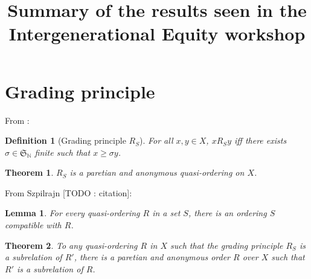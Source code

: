 \documentclass{article}
\title{Summary of the results seen in the Intergenerational Equity workshop}
\author{}
\newtheorem{definition}{Definition}
\newtheorem{theorem}{Theorem}
\newtheorem{lemma}{Lemma}
\begin{document}
\maketitle

\section{Grading principle}

From \cite{svensson80}:

\begin{definition}[Grading principle $R_S$]
    For all $x,y\in X$, $x R_S y$ iff there exists $\sigma\in\mathfrak{S}_{\mathbb{N}}$ finite
    such that $x\geq\sigma y$.
\end{definition}

\begin{theorem}
    $R_S$ is a paretian and anonymous quasi-ordering on $X$.
\end{theorem}

From Szpilrajn [TODO : citation]:
\begin{lemma}
    For every quasi-ordering $R$ in a set $S$, there is an ordering $S$ compatible with $R$.
\end{lemma}

\begin{theorem}
    To any quasi-ordering $R$ in $X$ such that the grading principle $R_S$ is a subrelation of
    $R'$, there is a paretian and anonymous order $R$ over $X$ such that $R'$ is a subrelation
    of $R$.
\end{theorem}


\end{document}
